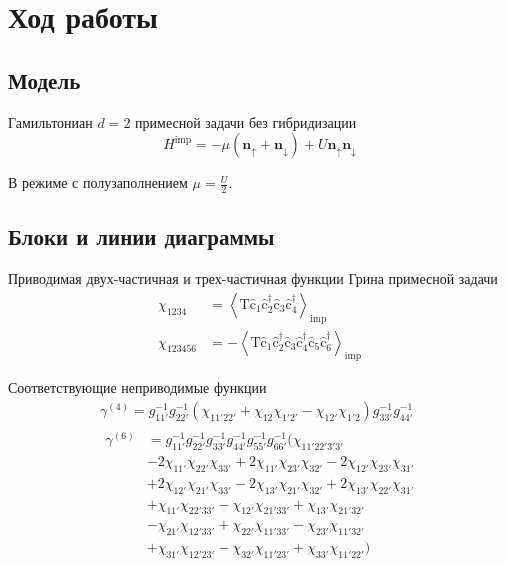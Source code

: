 \documentclass[11pt,a4paper]{report}
\begin{document}
\chapter{Ход работы}

\section{Модель}

Гамильтониан $d=2$ примесной задачи без гибридизации
\begin{equation}
\label{hamil}
 H^{\text{imp}} = -\mu(\mathbf{n}_\uparrow+\mathbf{n}_\downarrow) + U\mathbf{n}_\uparrow\mathbf{n}_\downarrow
\end{equation}

В режиме с полузаполнением $\mu = \frac{U}{2}$.

\section{Блоки и линии диаграммы}

Приводимая двух-частичная и трех-частичная функции Грина примесной задачи
\begin{equation}
\begin{split}
\chi_{1234} &= \left<\mathrm{T}\hat{\mathrm{c}}_1\hat{\mathrm{c}}^\dagger_2\hat{\mathrm{c}}_3\hat{\mathrm{c}}^\dagger_4\right>_\text{imp} \\
\chi_{123456} &= -\left<\mathrm{T}\hat{\mathrm{c}}_1\hat{\mathrm{c}}^\dagger_2\hat{\mathrm{c}}_3\hat{\mathrm{c}}^\dagger_4\hat{\mathrm{c}}_5\hat{\mathrm{c}}^\dagger_6\right>_\text{imp}
\end{split}
\end{equation}

Соответствующие неприводимые функции
\begin{equation}
\begin{split}
\gamma^{(4)} = g_{11'}^{-1}g_{22'}^{-1}\left(\chi_{11'22'}+\chi_{12}\chi_{1'2'}-\chi_{12'}\chi_{1'2}\right)g_{33'}^{-1}g_{44'}^{-1}
\\
\begin{aligned}
\gamma^{(6)} & =  g_{11'}^{-1}g_{22'}^{-1} g_{33'}^{-1}g_{44'}^{-1} g_{55'}^{-1}g_{66'}^{-1} ( \chi_{11'22'3'3'} \\
& -2 \chi_{11'} \chi_{22'} \chi_{33'} 
+2 \chi_{11'} \chi_{23'} \chi_{32'}
-2 \chi_{12'} \chi_{23'} \chi_{31'} \\ 
& +2 \chi_{12'} \chi_{21'} \chi_{33'}
-2 \chi_{13'} \chi_{21'} \chi_{32'}
+2 \chi_{13'} \chi_{22'} \chi_{31'} \\
& +\chi_{11'} \chi_{22'33'}
-\chi_{12'} \chi_{21'33'}
+\chi_{13'} \chi_{21'32'} \\
& -\chi_{21'} \chi_{12'33'}
+\chi_{22'} \chi_{11'33'}
-\chi_{23'} \chi_{11'32'} \\
& +\chi_{31'} \chi_{12'23'}
-\chi_{32'} \chi_{11'23'}
+\chi_{33'} \chi_{11'22'}
)
\end{aligned}
\end{split}
\end{equation}
\end{document}
